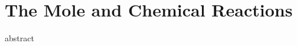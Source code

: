 \documentclass[main.tex]{subfiles}
\newcommand\chapterlabel{Ch-mole}\setcounter{figurenewcounter}{0}\setcounter{tablenewcounter}{0}\setcounter{formulanewcounter}{0}\chapterpicture{../{\chapterlabel}/figure1}\chapterpicturelabel{PngImg}
\begin{document}
 

\chapter[The Mole and Chemical Reactions ]{The Mole and Chemical Reactions}
%

{abstract}


%
%
%
% 
\end{document}

